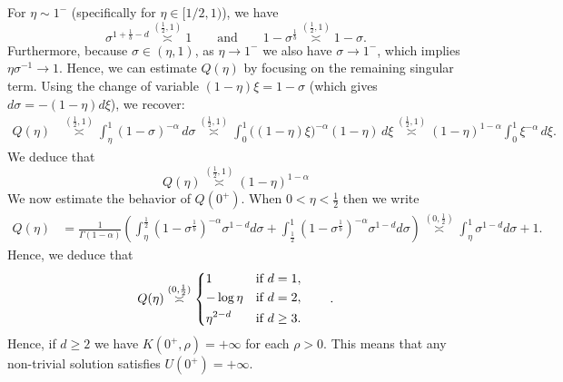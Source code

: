 \documentclass[a4paper]{article}
\theoremstyle{definition}
\newcommand{\asympint}[2]{\overset {(#1,#2)}\asymp }
\begin{document}
\bigskip

For $\eta \sim 1^-$ (specifically for $\eta \in [1/2, 1)$), we have
\begin{equation*}
  \sigma^{1 + \frac1 b - d} \asympint{\frac 1 2}{1} 1 \qquad \text{and} \qquad 1-\sigma^{\frac 1 b} \asympint{\frac 1 2}{1} 1-\sigma.
\end{equation*}
Furthermore, because $\sigma \in (\eta, 1)$, as $\eta \to 1^-$ we also have $\sigma \to 1^-$, which implies $\eta\sigma^{-1} \to 1$.
Hence, we can estimate $Q(\eta)$ by focusing on the remaining singular term. Using the change of variable $(1-\eta)\xi = 1-\sigma$ (which gives $d\sigma = -(1-\eta)d\xi$), we recover:
\begin{equation*}
  \begin{aligned}
    Q(\eta) & \asympint{\frac{1}{2}}{1} \int_\eta^1 (1-\sigma)^{-\alpha} \, d\sigma
    \asympint{\frac{1}{2}}{1} \int_0^1 \big((1-\eta)\xi\big)^{-\alpha} (1-\eta) \, d\xi
    \asympint{\frac{1}{2}}{1} (1-\eta)^{1-\alpha} \int_0^1 \xi^{-\alpha} \, d\xi.
  \end{aligned}
\end{equation*}
We deduce that
\begin{equation}
  \label{eq:Q away from 0}
  Q(\eta) \asympint{\frac{1}{2}}{1} (1 - \eta)^{1-\alpha}
\end{equation}
We now estimate the behavior of $Q(0^+)$. When $0 < \eta < \frac 1 2$ then we write
\begin{align*}
  Q(\eta) & = \frac{1}{\Gamma(1-\alpha)}\left( \int_\eta^{\frac 1 2} (1-\sigma^{\frac 1 b})^{-\alpha} \sigma^{1-d} d\sigma +  \int_{\frac 1 2}^1 (1-\sigma^{\frac 1 b})^{-\alpha} \sigma^{1-d} d\sigma \right)
  \asympint{0}{\frac 1 2} \int_\eta^1 \sigma^{1-d} d \sigma + 1.
\end{align*}
Hence, we deduce that
\begin{equation}
  \label{eq:Q close to 0}
  Q(\eta) \asympint{0}{\frac 1 2}
  \begin{dcases}
    1          & \text{if } d = 1,   \\
    -\log \eta & \text{if } d = 2,   \\
    \eta^{2-d} & \text{if } d \ge 3.
  \end{dcases}
  \qquad
  .
\end{equation}
Hence, if $d \ge 2$ we have $K(0^+, \rho) = +\infty$ for each $\rho > 0$. This means that any non-trivial solution satisfies $U(0^+) = +\infty$.

%
\end{document}
